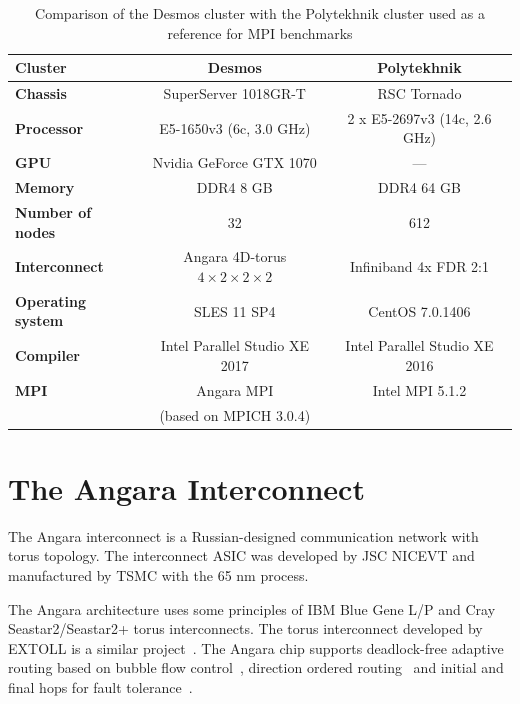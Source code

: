 \documentclass{llncs}
\begin{document}
\begin{table}
\caption{\label{tab:systems}Comparison of the Desmos cluster with the Polytekhnik cluster used as a reference for MPI benchmarks}
\begin{center}
\renewcommand{\arraystretch}{1}
\begin{tabular}{ l c c }
\toprule
\textbf{Cluster} & \textbf{Desmos} & \textbf{Polytekhnik} \\
\midrule
\textbf{Chassis} & SuperServer 1018GR-T & RSC Tornado \\
\midrule
\textbf{Processor} & E5-1650v3 (6c, 3.0 GHz) & 2 x E5-2697v3 (14c, 2.6 GHz)\\
\midrule
\textbf{GPU} & Nvidia GeForce GTX 1070& --- \\
\midrule
\textbf{Memory} & DDR4 8 GB & DDR4 64 GB\\
\midrule
\textbf{Number of nodes} & 32 & 612 \\
\midrule
\textbf{Interconnect} & Angara 4D-torus $4\times2\times2\times2$ & Infiniband 4x FDR 2:1\\
\midrule
\textbf{Operating system} & SLES 11 SP4 & CentOS 7.0.1406 \\
\midrule
\textbf{Compiler} & Intel Parallel Studio XE 2017 & Intel Parallel Studio XE 2016 \\
\midrule
\textbf{MPI} & Angara MPI  & Intel MPI 5.1.2 \\
  &  (based on MPICH 3.0.4) &   \\
\bottomrule
\end{tabular}
\end{center}
\end{table}



\section{The Angara Interconnect}

The Angara interconnect is a Russian-designed communication network with torus topology. The interconnect ASIC was developed by JSC NICEVT and manufactured by TSMC with the 65 nm process. 

The Angara architecture uses some principles of IBM Blue Gene L/P and Cray Seastar2/Seastar2+ torus interconnects. The torus interconnect developed by EXTOLL is a similar project~\cite{Extoll-2015}. The Angara chip supports deadlock-free adaptive routing based on bubble flow control~\cite{Puente:1999:ABR:850940.852882}, direction ordered routing~\cite{Scott96thecray,Adiga:2005:BGT:1665957.1665963} and initial and final hops for fault tolerance~\cite{Scott96thecray}.
\end{document}
